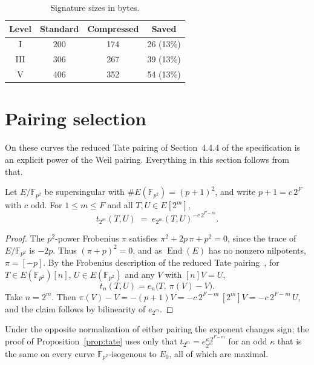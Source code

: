 \documentclass[version=submission]{iacrcc}
\begin{document}
\begin{table}[H]
\centering
\caption{Signature sizes in bytes.}
\label{tab:sizes}
\small
\begin{tabular}{c c c c}
\toprule
\textbf{Level} & \textbf{Standard} & \textbf{Compressed} & \textbf{Saved} \\
\midrule
I   & 200 & 174 & 26 (13\%) \\
III & 306 & 267 & 39 (13\%) \\
V   & 406 & 352 & 54 (13\%) \\
\bottomrule
\end{tabular}
\end{table}

\section{Pairing selection}
\label{sec:pairing}

On these curves the reduced Tate pairing of Section~4.4.4 of the
specification is an explicit power of the Weil pairing. Everything in
this section follows from that.

\begin{lemma}\label{lem:tate-weil}
Let $E/\mathbb{F}_{p^2}$ be supersingular with $\#E(\mathbb{F}_{p^2}) = (p+1)^2$, and write
$p+1 = c\,2^F$ with $c$ odd.
For $1 \le m \le F$ and all $T, U \in E[2^m]$,
\[
  t_{2^m}(T,U) \;=\; e_{2^m}(T,U)^{-c\,2^{F-m}} .
\]
\end{lemma}

\begin{proof}
The $p^2$-power Frobenius $\pi$ satisfies $\pi^2 + 2p\,\pi + p^2 = 0$, since the trace of $E/\mathbb{F}_{p^2}$ is $-2p$.
Thus $(\pi + p)^2 = 0$, and as $\operatorname{End}(E)$ has no nonzero nilpotents, $\pi = [-p]$.
By the Frobenius description of the reduced Tate pairing~\cite{schaefer}, for $T \in E(\mathbb{F}_{p^2})[n]$, $U \in E(\mathbb{F}_{p^2})$ and any $V$ with $[n]V = U$,
\[
  t_n(T,U) = e_n\bigl(T,\ \pi(V) - V\bigr).
\]
Take $n = 2^m$.
Then $\pi(V) - V = -(p+1)V = -c\,2^{F-m}\,[2^m]V = -c\,2^{F-m}\,U$, and the claim follows by bilinearity of $e_{2^m}$.
\end{proof}

\begin{remark}
Under the opposite normalization of either pairing the exponent changes
sign; the proof of Proposition~\ref{prop:tate} uses only that
$t_{2^m} = e_{2^m}^{\kappa\, 2^{F-m}}$ for an odd $\kappa$ that is the
same on every curve $\mathbb{F}_{p^2}$-isogenous to $E_0$, all of which
are maximal.
\end{remark}
\end{document}

